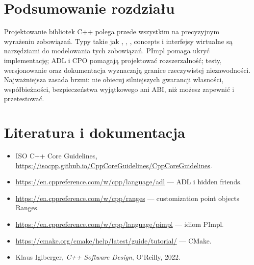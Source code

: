 \section*{Podsumowanie rozdziału}

Projektowanie bibliotek C++ polega przede wszystkim na precyzyjnym
wyrażeniu zobowiązań. Typy takie jak , ,
, concepts i interfejsy wirtualne są narzędziami do
modelowania tych zobowiązań. PImpl pomaga ukryć implementację; ADL
i CPO pomagają projektować rozszerzalność; testy, wersjonowanie
oraz dokumentacja wyznaczają granice rzeczywistej niezawodności.
Najważniejsza zasada brzmi: nie obiecuj silniejszych gwarancji własności,
współbieżności, bezpieczeństwa wyjątkowego ani ABI, niż możesz
zapewnić i przetestować.

\section*{Literatura i dokumentacja}
\begingroup\sloppy
\begin{itemize}
\item ISO C++ Core Guidelines, \url{https://isocpp.github.io/CppCoreGuidelines/CppCoreGuidelines}.
\item \url{https://en.cppreference.com/w/cpp/language/adl} --- ADL i hidden friends.
\item \url{https://en.cppreference.com/w/cpp/ranges} --- customization point objects Ranges.
\item \url{https://en.cppreference.com/w/cpp/language/pimpl} --- idiom PImpl.
\item \url{https://cmake.org/cmake/help/latest/guide/tutorial/} --- CMake.
\item Klaus Iglberger, \emph{C++ Software Design}, O'Reilly, 2022.
\end{itemize}
\endgroup
